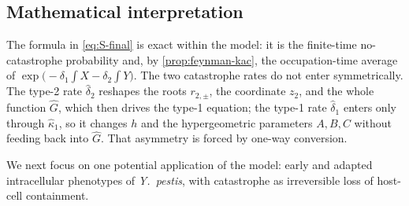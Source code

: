 \subsection{Mathematical interpretation}
\label{sec:interpretation}

The formula in \cref{eq:S-final} is exact within the model: it is the finite-time no-catastrophe probability and, by \cref{prop:feynman-kac}, the occupation-time average of $\exp\bigl(-\delta_1\int X-\delta_2\int Y\bigr)$. The two catastrophe rates do not enter symmetrically. The type-2 rate $\hat\delta_2$ reshapes the roots $r_{2,\pm}$, the coordinate $z_2$, and the whole function $\widehat G$, which then drives the type-1 equation; the type-1 rate $\hat\delta_1$ enters only through $\hat\kappa_1$, so it changes $h$ and the hypergeometric parameters $A,B,C$ without feeding back into $\widehat G$. That asymmetry is forced by one-way conversion.

We next focus on one potential application of the model: early and adapted intracellular phenotypes of \textit{Y.\ pestis}, with catastrophe as irreversible loss of host-cell containment.